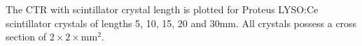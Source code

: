 \label{fig:standardctr} The CTR with scintillator crystal length is plotted for Proteus LYSO:Ce scintillator crystals of lengths 5, 10, 15, 20 and 30mm. All crystals possess a cross section of $2\times2\times$mm$^2$.
